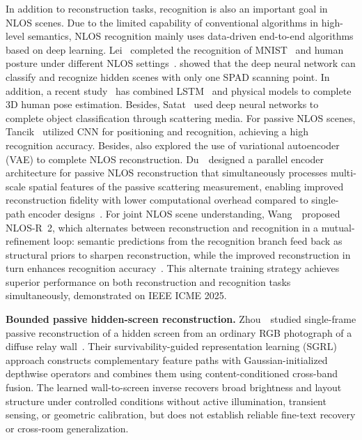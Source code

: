 In addition to reconstruction tasks, recognition is also an important goal in NLOS scenes. Due to the limited capability of conventional algorithms in high-level semantics, NLOS recognition mainly uses data-driven end-to-end algorithms based on deep learning. Lei \etal~completed the recognition of MNIST~\cite{lecunGradientbasedLearningApplied1998a} and human posture under different NLOS settings~\cite{leiDirectObjectRecognition2019}. \cite{caramazzaNeuralNetworkIdentification2017} showed that the deep neural network can classify and recognize hidden scenes with only one SPAD scanning point. In addition, a recent study~\cite{isogawaOpticalNonLineofSightPhysicsBased2020} has combined LSTM~\cite{hochreiterLongShortTermMemory1997} and physical models to complete 3D human pose estimation. Besides, Satat \etal~used deep neural networks to complete object classification through scattering media\cite{satatObjectClassificationScattering2017}.
For passive NLOS scenes, Tancik \etal~utilized CNN for positioning and recognition, achieving a high recognition accuracy\cite{DBLP:journals/corr/abs-1810-11710}. Besides, \cite{DBLP:journals/corr/abs-1810-11710} also explored the use of variational autoencoder (VAE)\cite{kingma_auto-encoding_2014} to complete NLOS reconstruction.
Du~\etal~designed a parallel encoder architecture for passive NLOS reconstruction that simultaneously processes multi-scale spatial features of the passive scattering measurement, enabling improved reconstruction fidelity with lower computational overhead compared to single-path encoder designs~\cite{du2025passive}. For joint NLOS scene understanding, Wang~\etal~proposed NLOS-R~2, which alternates between reconstruction and recognition in a mutual-refinement loop: semantic predictions from the recognition branch feed back as structural priors to sharpen reconstruction, while the improved reconstruction in turn enhances recognition accuracy~\cite{wang2025nlos}. This alternate training strategy achieves superior performance on both reconstruction and recognition tasks simultaneously, demonstrated on IEEE ICME 2025.


\vspace{0.8mm}
\noindent \textbf{Bounded passive hidden-screen reconstruction.}
Zhou~\etal~studied single-frame passive reconstruction of a hidden screen from an ordinary RGB photograph of a diffuse relay wall~\cite{zhouSurvivabilityHiddenScreen2026}. Their survivability-guided representation learning (SGRL) approach constructs complementary feature paths with Gaussian-initialized depthwise operators and combines them using content-conditioned cross-band fusion. The learned wall-to-screen inverse recovers broad brightness and layout structure under controlled conditions without active illumination, transient sensing, or geometric calibration, but does not establish reliable fine-text recovery or cross-room generalization.

